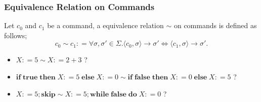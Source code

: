 \documentclass[12pt,aspectratio=169]{beamer}
\def\coloneqq{\mathrel{\mathop:}=}%
\newcommand{\cpair}[1]{\langle #1 \rangle}
\newcommand{\ifthen}[3]{\mathbf{if}\; #1 \; \mathbf{then}\; #2 \; \mathbf{else}\; #3}
\newcommand{\while}[2]{\mathbf{while}\; #1 \; \mathbf{do}\; #2}
\begin{document}
\begin{frame}
    \frametitle{Equivalence Relation on Commands}
    \begin{definition}
        Let $c_0$ and $c_1$ be a command,  
        a equivalence relation $\sim$ on commands is defined as follows;
        \[
            c_0 \sim c_1 \coloneqq \forall \sigma, \sigma' \in \Sigma . \cpair{c_0, \sigma} \to \sigma' \iff \cpair{c_1, \sigma} \to \sigma'.
        \]
    \end{definition}

    \begin{example}[Quiz]
        \begin{itemize}
            \item $X \coloneqq 5 \sim  X \coloneqq 2 + 3$ ? 
            \item $\ifthen{\mathbf{true}}{X \coloneqq 5}{X \coloneqq 0} \sim \ifthen{\mathbf{false}}{X \coloneqq 0}{X \coloneqq 5}$ ?
            \item $X \coloneqq 5 ; \mathbf{skip} \sim X \coloneqq 5 ; \while{\mathbf{false}}{X \coloneqq 0}$ ?
        \end{itemize}
    \end{example}

\end{frame}
\end{document}
